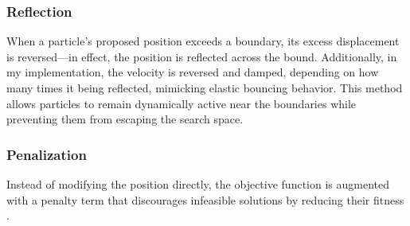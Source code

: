 {\subsubsection{Reflection}
    When a particle's proposed position exceeds a boundary, its excess displacement is reversed---in effect, the position is reflected across the bound. 
Additionally, in my implementation, the velocity is reversed and damped, depending on how many times it being reflected, mimicking elastic bouncing behavior.
% 
% 
% 
This method allows particles to remain dynamically active near the boundaries while preventing them from escaping the search space.

\subsubsection{Penalization}
    Instead of modifying the position directly, the objective function is augmented with a penalty term that discourages infeasible solutions by reducing their fitness \citep[see, e.g.,][]{parsopoulos2002particle}.
}
